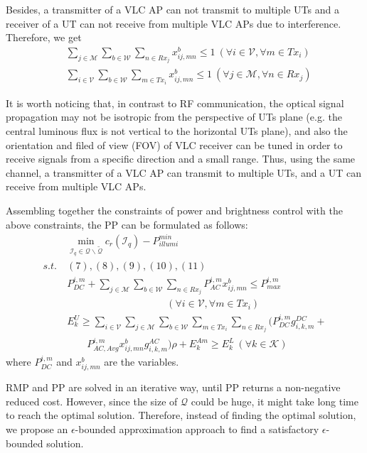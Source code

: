 \documentclass[10pt,journal]{IEEEtran}
\begin{document}
Besides, a transmitter of a VLC AP can not transmit to multiple UTs and a receiver of a UT can not receive from multiple VLC APs due to interference. Therefore, we get
\begin{align}
&\sum_{j\in\mathcal{M}}\sum_{b\in\mathcal{W}}\sum_{n\in Rx_{j}}x_{ij,mn}^{b}\leq1~(\forall i\in\mathcal{V}, \forall m\in Tx_{i})\\
&\sum_{i\in\mathcal{V}}\sum_{b\in\mathcal{W}}\sum_{m\in Tx_{i}}x_{ij,mn}^{b}\leq1~(\forall j\in\mathcal{M}, \forall n\in Rx_{j})
\end{align}

It is worth noticing that, in contrast to RF communication, the optical signal propagation may not be isotropic from the perspective of UTs plane (e.g. the central luminous flux is not vertical to the horizontal UTs plane), and also the orientation and filed of view (FOV) of VLC receiver can be tuned in order to receive signals from a specific direction and a small range. Thus, using the same channel, a transmitter of a VLC AP can transmit to multiple UTs, and a UT can receive from multiple VLC APs.

Assembling together the constraints of power and brightness control with the above constraints, the PP can be formulated as follows:
\begin{align}
&\min_{\mathcal{I}_{q}\in\mathcal{Q}\backslash\tilde{\mathcal{Q}}}c_{r}(\mathcal{I}_{q})-P_{illumi}^{min}\nonumber\\
s.t.~&(7),(8),(9),(10),(11)\nonumber\\
&P_{DC}^{i,m}+\sum_{j\in\mathcal{M}}\sum_{b\in\mathcal{W}}\sum_{n\in Rx_{j}}P_{AC}^{i,m}x_{ij,mn}^{b}\leq P_{max}^{i,m}\nonumber\\
&\qquad\qquad\qquad\qquad\qquad(\forall i\in\mathcal{V}, \forall m\in Tx_{i})\nonumber\\
&E_{k}^{U}\geq\sum_{i\in\mathcal{V}}\sum_{j\in\mathcal{M}}\sum_{b\in\mathcal{W}}\sum_{m\in Tx_{i}}\sum_{n\in Rx_{j}}(P_{DC}^{i,m}g_{i,k,m}^{DC}+\nonumber\\
&\qquad P_{AC,Avg}^{i,m}x_{ij,mn}^{b}g_{i,k,m}^{AC})\rho+E_{k}^{Am}\geq E_{k}^{L}~(\forall k\in\mathcal{K})\nonumber
\end{align}
where $P_{DC}^{i,m}$ and $x_{ij,mn}^{b}$ are the variables.

RMP and PP are solved in an iterative way, until PP returns a non-negative reduced cost. However, since the size of $\mathcal{Q}$ could be huge, it might take long time to reach the optimal solution. Therefore, instead of finding the optimal solution, we propose an $\epsilon$-bounded approximation approach to find a satisfactory $\epsilon$-bounded solution.
\end{document}
